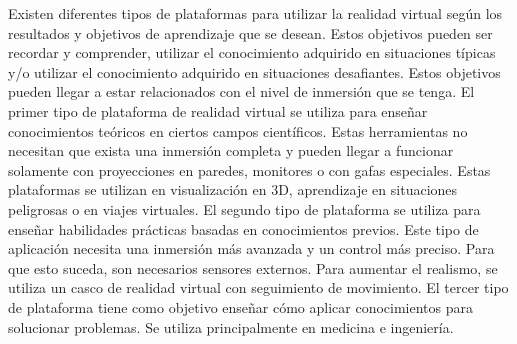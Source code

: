 Existen diferentes tipos de plataformas para utilizar la realidad virtual según los resultados y objetivos de aprendizaje que se desean. Estos objetivos pueden ser recordar y comprender, utilizar el conocimiento adquirido en situaciones típicas y/o utilizar el conocimiento adquirido en situaciones desafiantes. Estos objetivos pueden llegar a estar relacionados con el nivel de inmersión que se tenga. El primer tipo de plataforma de realidad virtual se utiliza para enseñar conocimientos teóricos en ciertos campos científicos. Estas herramientas no necesitan que exista una inmersión completa y pueden llegar a funcionar solamente con proyecciones en paredes, monitores o con gafas especiales. Estas plataformas se utilizan en visualización en 3D, aprendizaje en situaciones peligrosas o en viajes virtuales. El segundo tipo de plataforma se utiliza para enseñar habilidades prácticas basadas en conocimientos previos. Este tipo de aplicación necesita una inmersión más avanzada y un control más preciso. Para que esto suceda, son necesarios sensores externos. Para aumentar el realismo, se utiliza un casco de realidad virtual con seguimiento de movimiento. El tercer tipo de plataforma tiene como objetivo enseñar cómo aplicar conocimientos para solucionar problemas. Se utiliza principalmente en medicina e ingeniería. \cite{kaminska2019virtual}
